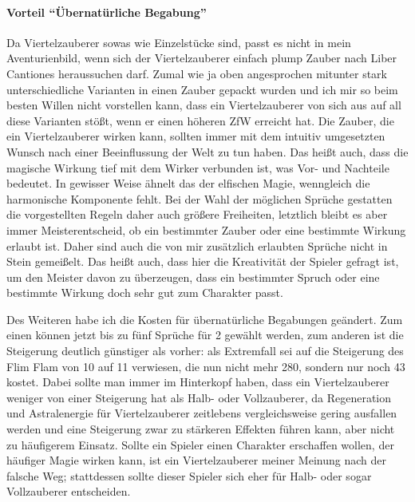 \paragraph{Vorteil \enquote{Übernatürliche Begabung}}
Da Viertelzauberer sowas wie Einzelstücke sind, passt es nicht in mein Aventurienbild, wenn sich der Viertelzauberer einfach plump Zauber nach Liber Cantiones heraussuchen darf. Zumal wie ja oben angesprochen mitunter stark unterschiedliche Varianten in einen Zauber gepackt wurden und ich mir so beim besten Willen nicht vorstellen kann, dass ein Viertelzauberer von sich aus auf all diese Varianten stößt, wenn er einen höheren ZfW erreicht hat. Die Zauber, die ein Viertelzauberer wirken kann, sollten immer mit dem intuitiv umgesetzten Wunsch nach einer Beeinflussung der Welt zu tun haben. Das heißt auch, dass die magische Wirkung tief mit dem Wirker verbunden ist, was Vor- und Nachteile bedeutet. In gewisser Weise ähnelt das der elfischen Magie, wenngleich die harmonische Komponente fehlt. Bei der Wahl der möglichen Sprüche gestatten die vorgestellten Regeln daher auch größere Freiheiten, letztlich bleibt es aber immer Meisterentscheid, ob ein bestimmter Zauber oder eine bestimmte Wirkung erlaubt ist. Daher sind auch die von mir zusätzlich erlaubten Sprüche nicht in Stein gemeißelt. Das heißt auch, dass hier die Kreativität der Spieler gefragt ist, um den Meister davon zu überzeugen, dass ein bestimmter Spruch oder eine bestimmte Wirkung doch sehr gut zum Charakter passt.

Des Weiteren habe ich die Kosten für übernatürliche Begabungen geändert. Zum einen können jetzt bis zu fünf Sprüche für \SI{2}{\GP} gewählt werden, zum anderen ist die Steigerung deutlich günstiger als vorher: als Extremfall sei auf die Steigerung des Flim Flam von 10 auf 11 verwiesen, die nun nicht mehr \SI{280}{\AP}, sondern nur noch \SI{43}{\AP} kostet. Dabei sollte man immer im Hinterkopf haben, dass ein Viertelzauberer weniger von einer Steigerung hat als Halb- oder Vollzauberer, da Regeneration und Astralenergie für Viertelzauberer zeitlebens vergleichsweise gering ausfallen werden und eine Steigerung zwar zu stärkeren Effekten führen kann, aber nicht zu häufigerem Einsatz. Sollte ein Spieler einen Charakter erschaffen wollen, der häufiger Magie wirken kann, ist ein Viertelzauberer meiner Meinung nach der falsche Weg; stattdessen sollte dieser Spieler sich eher für Halb- oder sogar Vollzauberer entscheiden.

